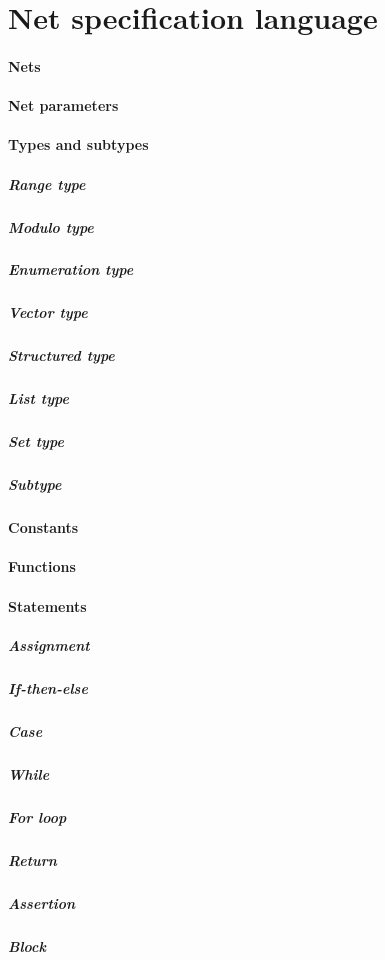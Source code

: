 \section{Net specification language}

\paragraph{Nets\\}\netdef

\paragraph{Net parameters\\}\netparametersdef

\paragraph{Types and subtypes\\}\typedef
\subparagraph{Range type\\}\rangetypedef
\subparagraph{Modulo type\\}\modulotypedef
\subparagraph{Enumeration type\\}\enumerationtypedef
\subparagraph{Vector type\\}\vectortypedef
\subparagraph{Structured type\\}\structuredtypedef
\subparagraph{List type\\}\listtypedef
\subparagraph{Set type\\}\settypedef
\subparagraph{Subtype\\}\subtypedef

\paragraph{Constants\\}\constantdef

\paragraph{Functions\\}\functiondef

\paragraph{Statements\\}\statementdef
\subparagraph{Assignment\\}\assignmentdef
\subparagraph{If-then-else\\}\ifdef
\subparagraph{Case\\}\casedef
\subparagraph{While\\}\whiledef
\subparagraph{For loop\\}\fordef
\subparagraph{Return\\}\returndef
\subparagraph{Assertion\\}\assertstatdef
\subparagraph{Block\\}\blockdef

